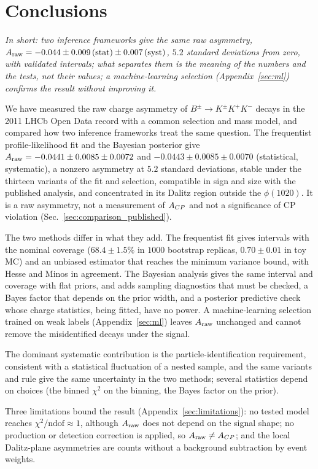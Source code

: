\section{Conclusions}
\label{sec:conclusions}
\emph{In short: two inference frameworks give the same raw asymmetry, $A_{\mathrm{raw}}=-0.044\pm0.009\,(\text{stat})\pm0.007\,(\text{syst})$, $5.2$ standard deviations from zero, with validated intervals; what separates them is the meaning of the numbers and the tests, not their values; a machine-learning selection (Appendix~\ref{sec:ml}) confirms the result without improving it.}

We have measured the raw charge asymmetry of $B^\pm\to K^\pm K^+K^-$ decays in the 2011 LHCb Open Data record with a common selection and mass model, and compared how two inference frameworks treat the same question. The frequentist profile-likelihood fit and the Bayesian posterior give $A_{\mathrm{raw}}=-0.0441\pm0.0085\pm0.0072$ and $-0.0443\pm0.0085\pm0.0070$ (statistical, systematic), a nonzero asymmetry at $5.2$ standard deviations, stable under the thirteen variants of the fit and selection, compatible in sign and size with the published analysis, and concentrated in its Dalitz region outside the $\phi(1020)$. It is a raw asymmetry, not a measurement of $A_{CP}$ and not a significance of CP violation (Sec.~\ref{sec:comparison_published}).

The two methods differ in what they add. The frequentist fit gives intervals with the nominal coverage ($68.4\pm1.5\%$ in $1000$ bootstrap replicas, $0.70\pm0.01$ in toy MC) and an unbiased estimator that reaches the minimum variance bound, with Hesse and Minos in agreement. The Bayesian analysis gives the same interval and coverage with flat priors, and adds sampling diagnostics that must be checked, a Bayes factor that depends on the prior width, and a posterior predictive check whose charge statistics, being fitted, have no power. A machine-learning selection trained on weak labels (Appendix~\ref{sec:ml}) leaves $A_{\mathrm{raw}}$ unchanged and cannot remove the misidentified decays under the signal.

The dominant systematic contribution is the particle-identification requirement, consistent with a statistical fluctuation of a nested sample, and the same variants and rule give the same uncertainty in the two methods; several statistics depend on choices (the binned $\chi^2$ on the binning, the Bayes factor on the prior).

Three limitations bound the result (Appendix~\ref{sec:limitations}): no tested model reaches $\chi^2/\mathrm{ndof}\approx1$, although $A_{\mathrm{raw}}$ does not depend on the signal shape; no production or detection correction is applied, so $A_{\mathrm{raw}}\neq A_{CP}$; and the local Dalitz-plane asymmetries are counts without a background subtraction by event weights.